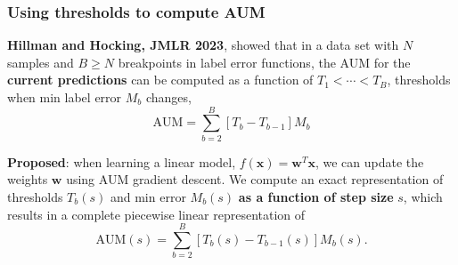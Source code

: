 \documentclass[t]{beamer}
\begin{document}
\begin{frame}
  \frametitle{Using thresholds to compute AUM}
\textbf{Hillman and Hocking, JMLR 2023}, showed that in a data set with $N$ samples and $B\geq N$ breakpoints in label error functions, the AUM for the
\textbf{current predictions} can be computed as a function of
$T_1<\cdots<T_B$, thresholds when min label error $M_b$ changes,
\begin{equation*}
  \text{AUM} = \sum_{b=2}^B [T_{b} - T_{b-1}] M_b
\end{equation*}

\textbf{Proposed}: when learning a linear model,
$f(\mathbf x)= \mathbf w^T \mathbf x$, we can update the weights
$\mathbf w$ using AUM gradient descent. We compute an exact
representation of thresholds $T_b(s)$ and min error $M_b(s)$ \textbf{as a
function of step size} $s$, which results in a complete piecewise
linear representation of
\begin{equation*}
  \text{AUM}(s) = \sum_{b=2}^B [T_{b}(s) - T_{b-1}(s)] M_b(s).
\end{equation*}
 
\end{frame}
\end{document}
